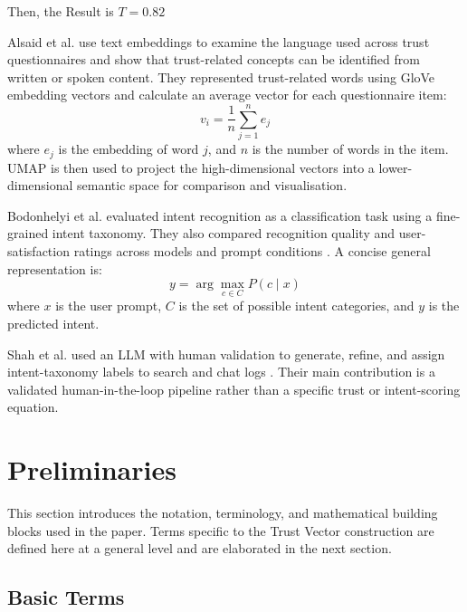 \documentclass[conference]{IEEEtran}
\begin{document}
Then, the Result is $T = 0.82$

Alsaid et al.\cite{ref37} use text embeddings to examine the language used across trust questionnaires and show that trust-related concepts can be identified from written or spoken content. They represented trust-related words using GloVe embedding vectors and calculate an average vector for each questionnaire item:
\begin{equation}
v_i = \frac{1}{n} \sum_{j=1}^n e_j
\end{equation}
where $e_j$ is the embedding of word $j$, and $n$ is the number of words in the item. UMAP is then used to project the high-dimensional vectors into a lower-dimensional semantic space for comparison and visualisation. 

Bodonhelyi et al. evaluated intent recognition as a classification task using a fine-grained intent taxonomy. They also compared recognition quality and user-satisfaction ratings across models and prompt conditions \cite{ref12}. A concise general representation is:
\begin{equation}
y = \arg\max_{c \in C} P(c \mid x)
\end{equation}
where $x$ is the user prompt, $C$ is the set of possible intent categories, and $y$ is the predicted intent. 

Shah et al. used an LLM with human validation to generate, refine, and assign intent-taxonomy labels to search and chat logs \cite{ref39}. Their main contribution is a validated human-in-the-loop pipeline rather than a specific trust or intent-scoring equation.



\section{Preliminaries}

This section introduces the notation, terminology, and mathematical building blocks used in the paper. Terms specific to the Trust Vector construction are defined here at a general level and are elaborated in the next section.

\subsection{Basic Terms}
\end{document}
